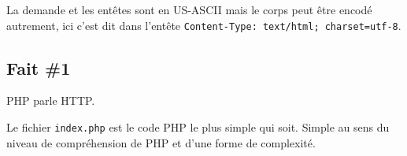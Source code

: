 La demande et les entêtes sont en US-ASCII mais le corps peut être
encodé autrement, ici c'est dit dans l'entête
\textenglish{\texttt{Content-Type:\ text/html;\ charset=utf-8}}.

\hypertarget{fait-1}{%
\subsection{Fait \#1}\label{fait-1}}

PHP parle HTTP.

Le fichier \textenglish{\texttt{index.php}} est le code PHP le plus
simple qui soit. Simple au sens du niveau de compréhension de PHP et
d'une forme de complexité.

\begin{english}

\begin{Shaded}
\begin{Highlighting}[]
 

\NormalTok{ = }\OtherTok{[}\OtherTok{]}  \OtherTok{;}
\NormalTok{ = } \OtherTok{(}\OtherTok{[}\OtherTok{]}  \OtherTok{);}

\NormalTok{ = } \OtherTok{(}\OtherTok{);}

\NormalTok{\textless{}!}
\NormalTok{\textgreater{}}
\NormalTok{\textless{}}
 \OtherTok{(}\NormalTok{ === }\OtherTok{):}
    \NormalTok{ = }\OtherTok{(}\OtherTok{);}
    \OtherTok{(}\OtherTok{(}\OtherTok{));}


\end{Highlighting}
\end{Shaded}
\end{english}
